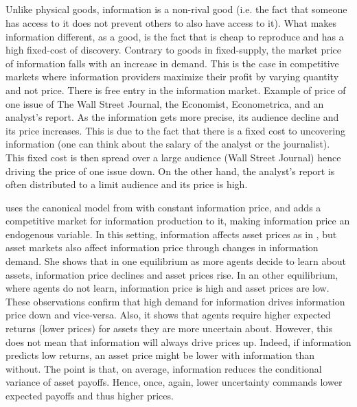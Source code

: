 \clearpage
\subsection{\textcite{Veldkamp2006}}
Unlike physical goods, information is a non-rival good (i.e. the fact that someone has access to it does not prevent others to also have access to it).
What makes information different, as a good, is the fact that is cheap to reproduce and has a high fixed-cost of discovery. 
Contrary to goods in fixed-supply, the market price of information falls with an increase in demand. This is the case in competitive markets where information providers maximize their profit by varying quantity and not price.
There is free entry in the information market.
Example of price of one issue of The Wall Street Journal, the Economist, Econometrica, and an analyst's report. As the information gets more precise, its audience decline and its price increases. This is due to the fact that there is a fixed cost to uncovering information (one can think about the salary of the analyst or the journalist). This fixed cost is then spread over a large audience (Wall Street Journal) hence driving the price of one issue down. On the other hand, the analyst's report is often distributed to a limit audience and its price is high. 

\textcite{Veldkamp2006} uses the canonical model from \textcite{Grossman1980} with constant information price, and adds a competitive market for information production to it, making information price an endogenous variable. In this setting, information affects asset prices as in \textcite{Grossman1980}, but asset markets also affect information price through changes in information demand. She shows that in one equilibrium as more agents decide to learn about assets, information price declines and asset prices rise. In an other equilibrium, where agents do not learn, information price is high and asset prices are low. These observations confirm that high demand for information drives information price down and vice-versa. Also, it shows that agents require higher expected returns (lower prices) for assets they are more uncertain about. However, this does not mean that information will always drive prices up. Indeed, if information predicts low returns, an asset price might be lower with information than without. The point is that, on average, information reduces the conditional variance of asset payoffs. Hence, once, again, lower uncertainty commands lower expected payoffs and thus higher prices.

